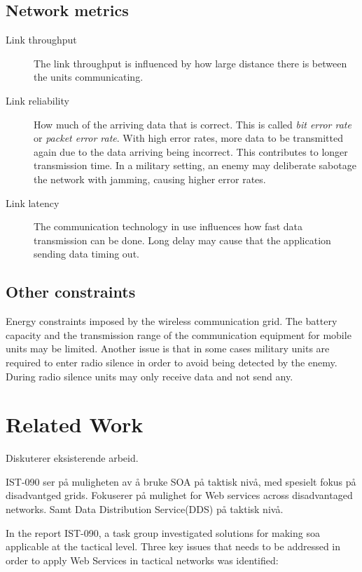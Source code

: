 \documentclass[USenglish]{ifimaster}
\begin{document}
\subsection{Network metrics}
\begin{description}

\item[Link throughput] The link throughput is influenced by how large distance
there is between the units communicating.

\item[Link reliability] How much of the arriving data that is correct. This is
called \textit{bit error rate} or \textit{packet error rate}. With high error
rates, more data to be transmitted again due to the data arriving being
incorrect. This contributes to longer transmission time. In a military setting,
an enemy may deliberate sabotage the network with jamming, causing higher error
rates.

\item[Link latency] The communication technology in use influences how fast data
transmission can be done. Long delay may cause that the application sending data
timing out.

\end{description}

\subsection{Other constraints}
Energy constraints imposed by the wireless communication grid. The battery
capacity and the transmission range of the communication equipment for mobile
units may be limited. Another issue is that in some cases military units are
required to enter radio silence in order to avoid being detected by the enemy.
During radio silence units may only receive data and not send any.


\section{Related Work}
Diskuterer eksisterende arbeid.

IST-090 ser på muligheten av å bruke SOA på taktisk nivå, med spesielt fokus på
disadvantged grids. Fokuserer på mulighet for Web services across disadvantaged
networks. Samt Data Distribution Service(DDS) på taktisk nivå.

In the report IST-090, a task group investigated solutions for making \gls{soa}
applicable at the tactical level. Three key issues that needs to be addressed in
order to apply Web Services in tactical networks was
identified\cite{IST-118}\cite{IST-090}:
\end{document}

